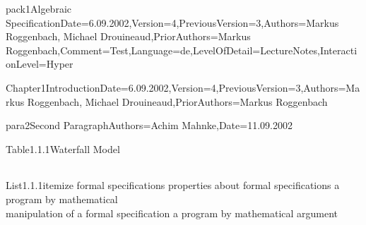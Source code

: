 \documentclass[landscape, slides, light]{mmiss2}
\begin{document}
\begin{Package}{pack1}{Algebraic
Specification}{Date=6.09.2002,Version=4,PreviousVersion=3,Authors={Markus
Roggenbach, Michael Drouineaud},PriorAuthors={Markus
Roggenbach},Comment=Test,Language=de,LevelOfDetail=LectureNotes,InteractionLevel=Hyper}
\begin{Section}{Chapter1}{Introduction}{Date=6.09.2002,Version=4,PreviousVersion=3,Authors={Markus
Roggenbach, Michael Drouineaud},PriorAuthors={Markus Roggenbach}}
\begin{Paragraph}[]{para2}{Second Paragraph}{Authors=Achim Mahnke,Date=11.09.2002}
\begin{Table}[LaTeX]{Table1.1.1}{Waterfall Model}{}
{\begin{center}
\begin{tabular}{lcl}
\end{tabular}
\end{center}
}
\end{Table}
\begin{List}{List1.1.1}{itemize}{}
\ListItem{}
{ formal specifications}
\ListItem{}
{ properties about formal specifications}
\ListItem{}
{ a program by mathematical \\
            manipulation of a formal specification}
\ListItem{}
{ a program by mathematical argument}
\end{List}
\end{Paragraph}
\end{Section}
\end{Package}
\end{document}
